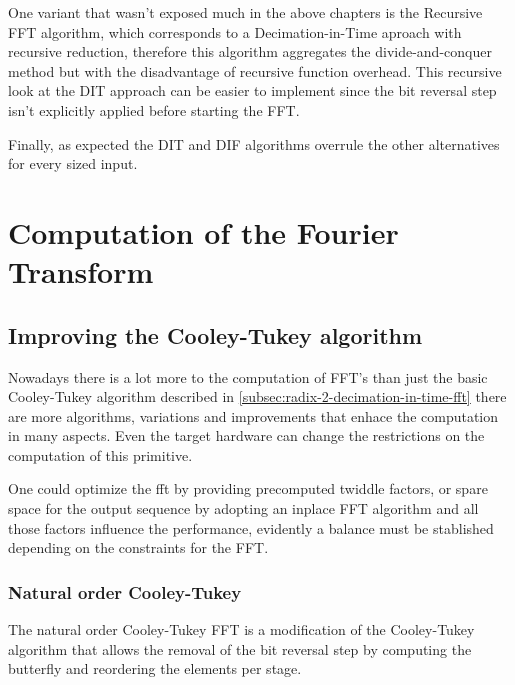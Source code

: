 \documentclass[
  oneside,
  11pt, a4paper,
  footinclude=true,
  headinclude=true,
  cleardoublepage=empty
]{scrbook}
\begin{document}
One variant that wasn't exposed much in the above chapters is the Recursive FFT algorithm, which corresponds to a Decimation-in-Time aproach with recursive reduction, therefore this algorithm aggregates the divide-and-conquer method but with the disadvantage of recursive function overhead. This recursive look at the DIT approach can be easier to implement since the bit reversal step isn't explicitly applied before starting the FFT.

Finally, as expected the DIT and DIF algorithms overrule the other alternatives for every sized input.



\chapter{Computation of the Fourier Transform}


\section{Improving the Cooley-Tukey algorithm}
Nowadays there is a lot more to the computation of FFT's than just the basic Cooley-Tukey algorithm described in \ref{subsec:radix-2-decimation-in-time-fft} there are more algorithms, variations and improvements that enhace the computation in many aspects. Even the target hardware can change the restrictions on the computation of this primitive.

One could optimize the fft by providing precomputed twiddle factors, or spare space for the output sequence by adopting an inplace FFT algorithm  and all those factors influence the performance, evidently a balance must be stablished depending on the constraints for the FFT.

\subsection{Natural order Cooley-Tukey}

The natural order Cooley-Tukey FFT is a modification of the Cooley-Tukey algorithm that allows the removal of the bit reversal step by computing the butterfly and reordering the elements per stage.
\end{document}
